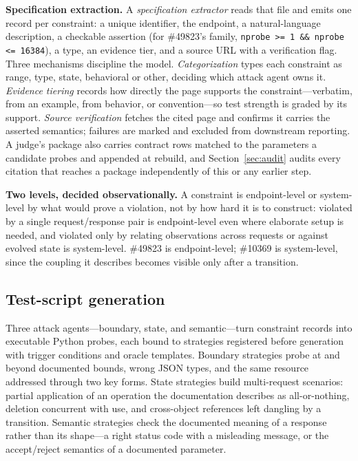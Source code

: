 \documentclass[acmsmall,screen,review,anonymous]{acmart}
\begin{document}
\textbf{Specification extraction.} A \emph{specification extractor} reads that file and emits one
record per constraint: a unique identifier, the endpoint, a natural-language description, a
checkable assertion (for \#49823's family, \texttt{nprobe >= 1 \&\& nprobe <= 16384}), a type, an
evidence tier, and a source URL with a verification flag. Three mechanisms discipline the model.
\emph{Categorization} types each constraint as range, type, state, behavioral or other, deciding
which attack agent owns it. \emph{Evidence tiering} records how directly the page supports the
constraint---verbatim, from an example, from behavior, or convention---so test strength is graded
by its support. \emph{Source verification} fetches the cited page and confirms it carries the
asserted semantics; failures are marked and excluded from downstream reporting. A judge's package
also carries contract rows matched to the parameters a candidate probes and appended at rebuild, and
Section~\ref{sec:audit} audits every citation that reaches a package independently of this or any
earlier step.

\textbf{Two levels, decided observationally.} A constraint is endpoint-level or system-level by what
would prove a violation, not by how hard it is to construct: violated by a single request/response
pair is endpoint-level even where elaborate setup is needed, and violated only by relating
observations across requests or against evolved state is system-level. \#49823 is endpoint-level;
\#10369 is system-level, since the coupling it describes becomes visible only after a transition.

\subsection{Test-script generation}
\label{subsec:generation}

Three attack agents---boundary, state, and semantic---turn constraint records into executable Python
probes, each bound to strategies registered before generation with trigger conditions and oracle
templates. Boundary strategies probe at and beyond documented bounds, wrong JSON types, and the same
resource addressed through two key forms. State strategies build multi-request scenarios: partial
application of an operation the documentation describes as all-or-nothing, deletion concurrent with
use, and cross-object references left dangling by a transition. Semantic strategies check the
documented meaning of a response rather than its shape---a right status code with a misleading
message, or the accept/reject semantics of a documented parameter.
\end{document}
